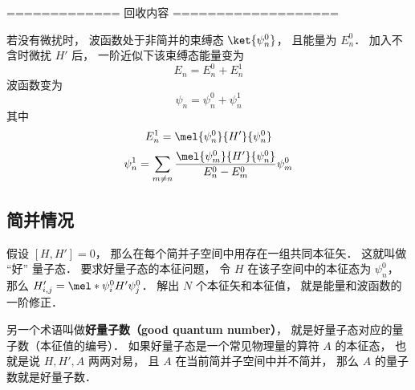 ============= 回收内容 ===================

若没有微扰时， 波函数处于非简并的束缚态 $\ket{\psi_n^0}$， 且能量为 $E_n^0$． 加入不含时微扰 $H'$ 后， 一阶近似下该束缚态能量变为
\begin{equation}
E_n = E_n^0 + E_n^1
\end{equation}
波函数变为
\begin{equation}
\psi_n = \psi_n^0 + \psi_n^1
\end{equation}
其中
\begin{equation}
E_n^1 = \mel{\psi_n^0}{H'}{\psi_n^0}
\end{equation}
\begin{equation}
\psi_n^1 = \sum_{m \ne n} \frac{\mel{\psi_m^0}{H'}{\psi_n^0}}{E_n^0 - E_m^0} \psi_m^0
\end{equation}

\subsection{简并情况}
假设 $[H, H'] = 0$， 那么在每个简并子空间中用存在一组共同本征矢． 这就叫做 “好” 量子态． 要求好量子态的本征问题， 令 $H$ 在该子空间中的本征态为 $\psi_n^0$， 那么 $H'_{i,j} = \mel*{\psi_i^0}{H'}{\psi_j^0}$． 解出 $N$ 个本征矢和本征值， 就是能量和波函数的一阶修正．

另一个术语叫做\textbf{好量子数（good quantum number）}， 就是好量子态对应的量子数（本征值的编号）． 如果好量子态是一个常见物理量的算符 $A$ 的本征态， 也就是说 $H, H', A$ 两两对易， 且 $A$ 在当前简并子空间中并不简并， 那么 $A$ 的量子数就是好量子数．
